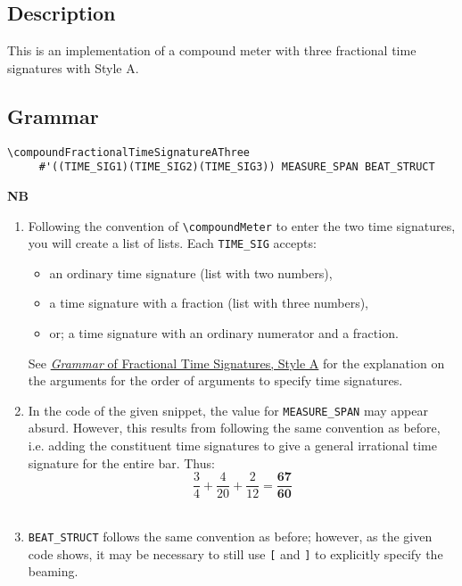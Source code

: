 \hfill
{}
\hfill

\subsection{Description}
This is an implementation of a compound meter with three fractional time signatures with Style A.  


\subsection{Grammar}
\label{sec:compoundfractionalmeter_grammar}
\begin{verbatim}
\compoundFractionalTimeSignatureAThree 
     #'((TIME_SIG1)(TIME_SIG2)(TIME_SIG3)) MEASURE_SPAN BEAT_STRUCT
\end{verbatim}
\textbf{NB} 
\begin{enumerate}
\item Following the convention of \verb|\compoundMeter| to enter the two time signatures, you will create a list of lists. Each \verb|TIME_SIG| accepts: 
\begin{itemize}
\item an ordinary time signature (list with two numbers), 
\item a time signature with a fraction (list with three numbers), 
\item or; a time signature with an ordinary numerator and a fraction.
\end{itemize} 
See \hyperref[sec:time_signatures_styleA_convention]{\textit{Grammar} of Fractional Time Signatures, Style A} for the explanation on the arguments for the order of arguments to specify time signatures.
\item In the code of the given snippet, the value for \verb|MEASURE_SPAN| may appear absurd. However, this results from following the same convention as before, i.e. adding the constituent time signatures to give a general irrational time signature for the entire bar. Thus: \\
\[ \frac{3}{4} +\frac{4}{20} + \frac{2}{12} = \mathbf{\frac{67}{60}}\] \\
\item \verb|BEAT_STRUCT| follows the same convention as before; however, as the given code shows, it may be necessary to still use \verb|[| and \verb|]| to explicitly specify the beaming. 
\end{enumerate}

